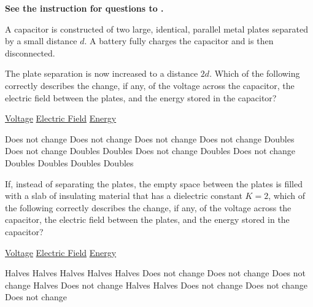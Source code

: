 \textbf{See the instruction for questions  to .}

A capacitor is constructed of two large, identical, parallel metal plates separated by a small distance $d$. A battery fully charges the capacitor and is then disconnected.

\begin{questions}\setcounter{question}{3}\question
The plate separation is now increased to a distance $2d$. Which of the following correctly describes the change, if any, of the voltage across the capacitor, the electric field between the plates, and the energy stored in the capacitor?

\tabto{0.75cm} \underline{Voltage}
\tabto{4.50cm} \underline{Electric Field}
\tabto{8.25cm} \underline{Energy}

\begin{choices}
\choice
    Does not change
    \tabto{3.75cm} Does not change
    \tabto{7.50cm} Does not change
\choice
    Does not change
    \tabto{3.75cm} Doubles        
    \tabto{7.50cm} Does not change
\choice
    Doubles        
    \tabto{3.75cm} Doubles        
    \tabto{7.50cm} Does not change
\choice
    Doubles        
    \tabto{3.75cm} Does not change
    \tabto{7.50cm}  Doubles
\choice
    Doubles        
    \tabto{3.75cm} Doubles        
    \tabto{7.50cm} Doubles
\end{choices}\end{questions}

\begin{questions}\setcounter{question}{4}\question
If, instead of separating the plates, the empty space between the plates is filled with a slab of insulating material that has a dielectric constant $K=2$, which of the following correctly describes the change, if any, of the voltage across the capacitor, the electric field between the plates, and the energy stored in the capacitor?

\tabto{0.75cm} \underline{Voltage}
\tabto{4.50cm} \underline{Electric Field}
\tabto{8.25cm} \underline{Energy}

\begin{choices}
\choice Halves          \tabto{3.75cm} Halves          \tabto{7.50cm} Halves
\choice Halves          \tabto{3.75cm} Halves          \tabto{7.50cm} Does not change
\choice Does not change \tabto{3.75cm} Does not change \tabto{7.50cm} Halves
\choice Does not change \tabto{3.75cm} Halves          \tabto{7.50cm} Halves
\choice Does not change \tabto{3.75cm} Does not change \tabto{7.50cm} Does not change
\end{choices}\end{questions}

